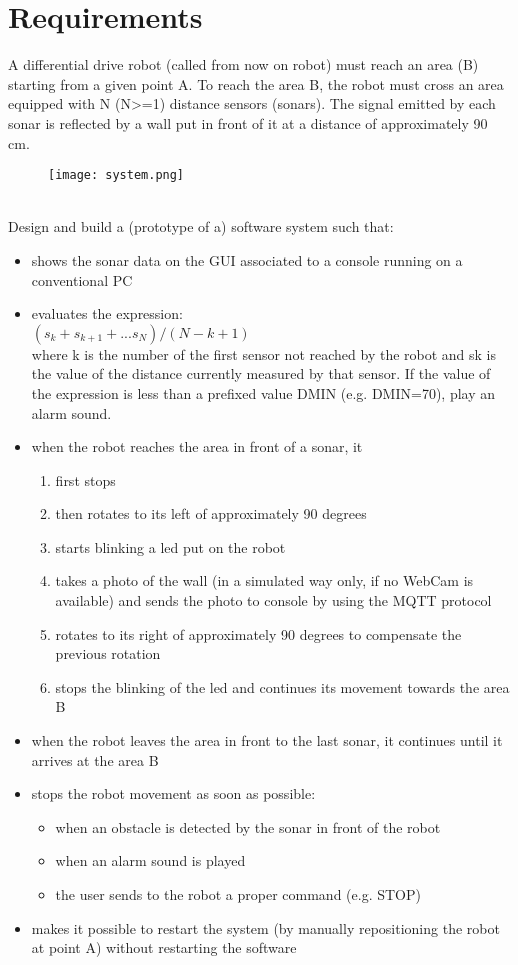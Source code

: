 \section{Requirements}
A differential drive robot (called from now on robot) must reach an area (B) starting from a given point A. To reach the area B, the robot must cross an area equipped with N (N>=1) distance sensors (sonars). The signal emitted by each sonar is reflected by a wall put in front of it at a distance of approximately 90 cm.
\begin{figure}[h]
	\centering
	\texttt{[image: system.png]}
\end{figure}
\\
Design and build a (prototype of a) software system such that:
\begin{itemize}
	\item shows the sonar data on the GUI associated to a console running on a conventional PC
	\item evaluates the expression: \\
			$ (s_{k} + s_{k+1} + ... s_{N}) / (N-k+1) $ \\
			where k is the number of the first sensor not reached by the robot and sk is the value of the distance currently measured by that sensor. If the value of the expression is less than a prefixed value DMIN (e.g. DMIN=70), play an alarm sound.
	\item when the robot reaches the area in front of a sonar, it
			\begin{enumerate}
				\item first stops
				\item then rotates to its left of approximately 90 degrees
				\item starts blinking a led put on the robot
				\item takes a photo of the wall (in a simulated way only, if no WebCam is available) and sends the photo to console by using the MQTT protocol
				\item rotates to its right of approximately 90 degrees to compensate the previous rotation
				\item stops the blinking of the led and continues its movement towards the area B
			\end{enumerate}
	\item when the robot leaves the area in front to the last sonar, it continues until it arrives at the area B
	\item stops the robot movement as soon as possible:
	\begin{itemize}
		\item when an obstacle is detected by the sonar in front of the robot
		\item when an alarm sound is played
		\item the user sends to the robot a proper command (e.g. STOP)
	\end{itemize}
	\item makes it possible to restart the system (by manually repositioning the robot at point A) without restarting the software
\end{itemize}
